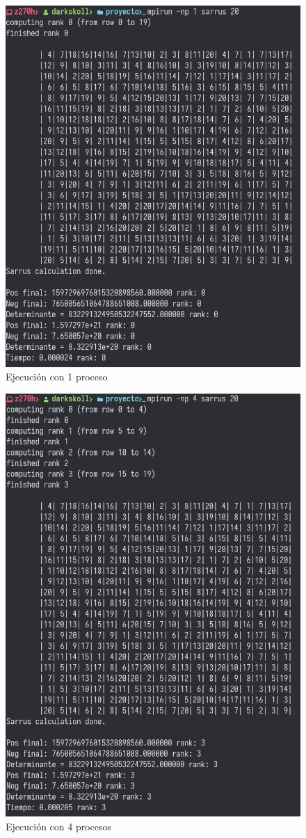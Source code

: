 \documentclass[10pt]{IEEEtran}
\begin{document}
\begin{figure}%
  \centering
  \includegraphics[width=0.8\linewidth]{20x20np1.png}
  \caption{Ejecución con 1 proceso}
  \label{fig:20x20np1}
\end{figure}

\begin{figure}%
  \centering
  \includegraphics[width=0.8\linewidth]{20x20np4.png}
  \caption{Ejecución con 4 procesos}%
  \label{fig:20x20np4}
\end{figure}
\end{document}
